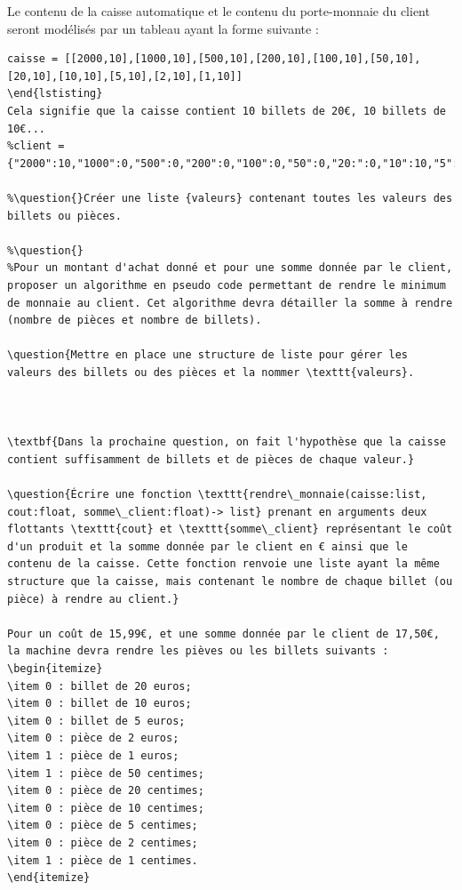 Le contenu de la caisse automatique et le contenu du porte-monnaie du client seront modélisés par un tableau ayant la forme suivante : 
\begin{lstlisting}
caisse = [[2000,10],[1000,10],[500,10],[200,10],[100,10],[50,10],[20,10],[10,10],[5,10],[2,10],[1,10]]
\end{lstisting}
Cela signifie que la caisse contient 10 billets de 20€, 10 billets de 10€... 
%client = {"2000":10,"1000":0,"500":0,"200":0,"100":0,"50":0,"20:":0,"10":10,"5":10,"2":0,"1":0}

%\question{}Créer une liste {valeurs} contenant toutes les valeurs des billets ou pièces.

%\question{}
%Pour un montant d'achat donné et pour une somme donnée par le client, proposer un algorithme en pseudo code permettant de rendre le minimum de monnaie au client. Cet algorithme devra détailler la somme à rendre (nombre de pièces et nombre de billets).

\question{Mettre en place une structure de liste pour gérer les valeurs des billets ou des pièces et la nommer \texttt{valeurs}.



\textbf{Dans la prochaine question, on fait l'hypothèse que la caisse contient suffisamment de billets et de pièces de chaque valeur.}

\question{Écrire une fonction \texttt{rendre\_monnaie(caisse:list, cout:float, somme\_client:float)-> list} prenant en arguments deux flottants \texttt{cout} et \texttt{somme\_client} représentant le coût d'un produit et la somme donnée par le client en € ainsi que le contenu de la caisse. Cette fonction renvoie une liste ayant la même structure que la caisse, mais contenant le nombre de chaque billet (ou pièce) à rendre au client.}

Pour un coût de 15,99€, et une somme donnée par le client de 17,50€, la machine devra rendre les pièves ou les billets suivants : 
\begin{itemize}
\item 0 : billet de 20 euros;
\item 0 : billet de 10 euros;
\item 0 : billet de 5 euros;
\item 0 : pièce de 2 euros;
\item 1 : pièce de 1 euros;
\item 1 : pièce de 50 centimes;
\item 0 : pièce de 20 centimes;
\item 0 : pièce de 10 centimes;
\item 0 : pièce de 5 centimes;
\item 0 : pièce de 2 centimes;
\item 1 : pièce de 1 centimes.
\end{itemize}


\end{lstlisting}
